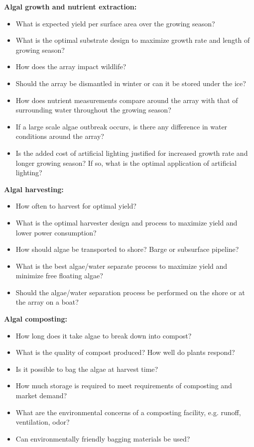 \documentclass{article}
\begin{document}
\textbf{Algal growth and nutrient extraction:}
\begin{itemize}
  \item{What is expected yield per surface area over the growing season?}
  \item{What is the optimal substrate design to maximize growth rate and length of growing season?}
  \item{How does the array impact wildlife?}
  \item{Should the array be dismantled in winter or can it be stored under the ice?}
  \item{How does nutrient measurements compare around the array with that of surrounding water throughout the growing season?}
  \item{If a large scale algae outbreak occurs, is there any difference in water conditions around the array?}
  \item{Is the added cost of artificial lighting justified for increased growth rate and longer growing season?
        If so, what is the optimal application of artificial lighting?}
\end{itemize}

\textbf{Algal harvesting:}
\begin{itemize}
  \item{How often to harvest for optimal yield?}
  \item{What is the optimal harvester design and process to maximize yield and lower power consumption?}
  \item{How should algae be transported to shore?  Barge or subsurface pipeline?}
  \item{What is the best algae/water separate process to maximize yield and minimize free floating algae?}
  \item{Should the algae/water separation process be performed on the shore or at the array on a boat?}
\end{itemize}

\textbf{Algal composting:}
\begin{itemize}
  \item{How long does it take algae to break down into compost?}
  \item{What is the quality of compost produced?  How well do plants respond?}
  \item{Is it possible to bag the algae at harvest time?}
  \item{How much storage is required to meet requirements of composting and market demand?}
  \item{What are the environmental concerns of a composting facility, e.g. runoff, ventilation, odor?}
  \item{Can environmentally friendly bagging materials be used?}
\end{itemize}
\end{document}
